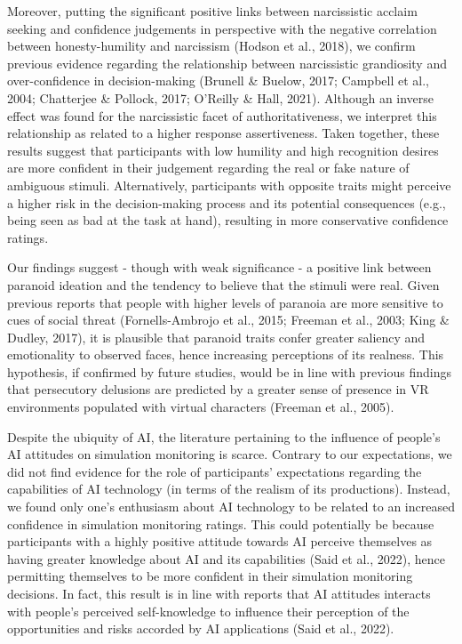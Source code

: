 \documentclass[
  man,mask,floatsintext]{apa6}
\begin{document}
Moreover, putting the significant positive links between narcissistic acclaim seeking and confidence judgements in perspective with the negative correlation between honesty-humility and narcissism (Hodson et al., 2018), we confirm previous evidence regarding the relationship between narcissistic grandiosity and over-confidence in decision-making (Brunell \& Buelow, 2017; Campbell et al., 2004; Chatterjee \& Pollock, 2017; O'Reilly \& Hall, 2021). Although an inverse effect was found for the narcissistic facet of authoritativeness, we interpret this relationship as related to a higher response assertiveness. Taken together, these results suggest that participants with low humility and high recognition desires are more confident in their judgement regarding the real or fake nature of ambiguous stimuli. Alternatively, participants with opposite traits might perceive a higher risk in the decision-making process and its potential consequences (e.g., being seen as bad at the task at hand), resulting in more conservative confidence ratings.

Our findings suggest - though with weak significance - a positive link between paranoid ideation and the tendency to believe that the stimuli were real. Given previous reports that people with higher levels of paranoia are more sensitive to cues of social threat (Fornells-Ambrojo et al., 2015; Freeman et al., 2003; King \& Dudley, 2017), it is plausible that paranoid traits confer greater saliency and emotionality to observed faces, hence increasing perceptions of its realness. This hypothesis, if confirmed by future studies, would be in line with previous findings that persecutory delusions are predicted by a greater sense of presence in VR environments populated with virtual characters (Freeman et al., 2005).

Despite the ubiquity of AI, the literature pertaining to the influence of people's AI attitudes on simulation monitoring is scarce. Contrary to our expectations, we did not find evidence for the role of participants' expectations regarding the capabilities of AI technology (in terms of the realism of its productions). Instead, we found only one's enthusiasm about AI technology to be related to an increased confidence in simulation monitoring ratings. This could potentially be because participants with a highly positive attitude towards AI perceive themselves as having greater knowledge about AI and its capabilities (Said et al., 2022), hence permitting themselves to be more confident in their simulation monitoring decisions. In fact, this result is in line with reports that AI attitudes interacts with people's perceived self-knowledge to influence their perception of the opportunities and risks accorded by AI applications (Said et al., 2022).
\end{document}
